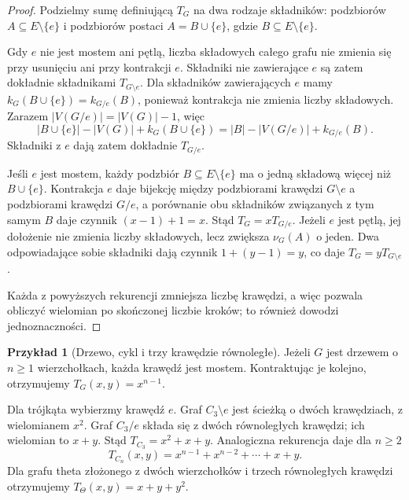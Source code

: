 \documentclass[11pt,a4paper]{report}
\numberwithin{equation}{section}
\theoremstyle{plain}
\theoremstyle{definition}
\newtheorem{przyklad}[twierdzenie]{Przykład}
\theoremstyle{remark}
\begin{document}
\begin{proof}
Podzielmy sumę definiującą $T_G$ na dwa rodzaje składników:
podzbiorów $A\subseteq E\setminus\{e\}$ i podzbiorów
postaci $A=B\cup\{e\}$, gdzie $B\subseteq E\setminus\{e\}$.

Gdy $e$ nie jest mostem ani pętlą, liczba składowych całego
grafu nie zmienia się przy usunięciu ani przy kontrakcji $e$.
Składniki nie zawierające $e$ są zatem dokładnie składnikami
$T_{G\setminus e}$. Dla składników zawierających $e$ mamy
$k_G(B\cup\{e\})=k_{G/e}(B)$, ponieważ kontrakcja
nie zmienia liczby składowych. Zarazem
$|V(G/e)|=|V(G)|-1$, więc
\[
|B\cup\{e\}|-|V(G)|+k_G(B\cup\{e\})
=|B|-|V(G/e)|+k_{G/e}(B).
\]
Składniki z $e$ dają zatem dokładnie $T_{G/e}$.

Jeśli $e$ jest mostem, każdy podzbiór $B\subseteq E\setminus\{e\}$
ma o jedną składową więcej niż $B\cup\{e\}$.
Kontrakcja $e$ daje bijekcję między podzbiorami krawędzi
$G\setminus e$ a podzbiorami krawędzi $G/e$, a porównanie
obu składników związanych z tym samym $B$ daje czynnik
$(x-1)+1=x$. Stąd $T_G=xT_{G/e}$.
Jeżeli $e$ jest pętlą, jej dołożenie nie zmienia liczby
składowych, lecz zwiększa $\nu_G(A)$ o jeden.
Dwa odpowiadające sobie składniki dają czynnik
$1+(y-1)=y$, co daje $T_G=yT_{G\setminus e}$.

Każda z powyższych rekurencji zmniejsza liczbę krawędzi,
a więc pozwala obliczyć wielomian po skończonej liczbie
kroków; to również dowodzi jednoznaczności.
\end{proof}

\begin{przyklad}[Drzewo, cykl i trzy krawędzie równoległe]
Jeżeli $G$ jest drzewem o $n\ge1$ wierzchołkach,
każda krawędź jest mostem. Kontraktując je kolejno,
otrzymujemy $T_G(x,y)=x^{n-1}$.

Dla trójkąta wybierzmy krawędź $e$.
Graf $C_3\setminus e$ jest ścieżką o dwóch krawędziach,
z wielomianem $x^2$. Graf $C_3/e$ składa się z dwóch
równoległych krawędzi; ich wielomian to $x+y$.
Stąd
$T_{C_3}=x^2+x+y$.
Analogiczna rekurencja daje dla $n\ge2$
\[
 T_{C_n}(x,y)=x^{n-1}+x^{n-2}+\cdots+x+y.
\]
Dla grafu theta złożonego z dwóch wierzchołków
i trzech równoległych krawędzi otrzymujemy
$T_{\Theta}(x,y)=x+y+y^2$.
\end{przyklad}
\end{document}
